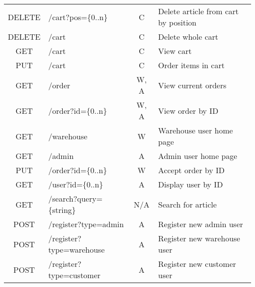\documentclass{article}
\begin{document}
\begin{table}[H]
\begin{tabular}{|clcl|}
\multicolumn{1}{|l|}{DELETE} & \multicolumn{1}{l|}{/cart?pos=\{0..n\}}       & \multicolumn{1}{c|}{C}       & Delete article from cart by position \\
\multicolumn{1}{|l|}{DELETE} & \multicolumn{1}{l|}{/cart}                    & \multicolumn{1}{c|}{C}       & Delete whole cart                    \\
\multicolumn{1}{|c|}{GET}    & \multicolumn{1}{l|}{/cart}                    & \multicolumn{1}{c|}{C}       & View cart                            \\
\multicolumn{1}{|c|}{PUT}    & \multicolumn{1}{l|}{/cart}                    & \multicolumn{1}{c|}{C}       & Order items in cart                  \\
\multicolumn{1}{|c|}{GET}    & \multicolumn{1}{l|}{/order}                   & \multicolumn{1}{c|}{W, A}    & View current orders                  \\
\multicolumn{1}{|c|}{GET}    & \multicolumn{1}{l|}{/order?id=\{0..n\}}       & \multicolumn{1}{c|}{W, A}    & View order by ID                     \\
\multicolumn{1}{|c|}{GET}    & \multicolumn{1}{l|}{/warehouse}               & \multicolumn{1}{c|}{W}       & Warehouse user home page             \\
\multicolumn{1}{|c|}{GET}    & \multicolumn{1}{l|}{/admin}                   & \multicolumn{1}{c|}{A}       & Admin user home page                 \\
\multicolumn{1}{|c|}{PUT}    & \multicolumn{1}{l|}{/order?id=\{0..n\}}       & \multicolumn{1}{c|}{W}       & Accept order by ID                   \\
\multicolumn{1}{|c|}{GET}    & \multicolumn{1}{l|}{/user?id=\{0..n\}}        & \multicolumn{1}{c|}{A}       & Display user by ID                   \\
\multicolumn{1}{|c|}{GET}    & \multicolumn{1}{l|}{/search?query=\{string\}}        & \multicolumn{1}{c|}{N/A}       & Search for article                   \\
\multicolumn{1}{|c|}{POST}   & \multicolumn{1}{l|}{/register?type=admin}     & \multicolumn{1}{c|}{A}       & Register new admin user              \\
\multicolumn{1}{|c|}{POST}   & \multicolumn{1}{l|}{/register?type=warehouse} & \multicolumn{1}{c|}{A}       & Register new warehouse user          \\
\multicolumn{1}{|c|}{POST}   & \multicolumn{1}{l|}{/register?type=customer}  & \multicolumn{1}{c|}{A}       & Register new customer user           \\ \hline
\end{tabular}
\end{table}
\fi
\end{document}
